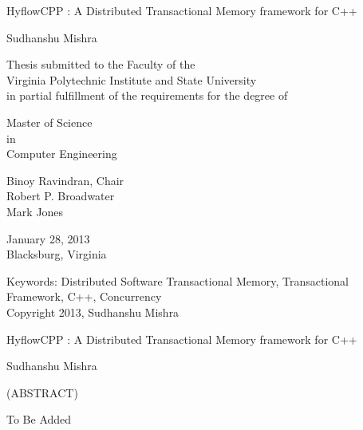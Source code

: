 \documentclass[12pt,english]{report}
\begin{document}
\thispagestyle{empty}
\begin{center}

{\Large 
HyflowCPP : A Distributed Transactional Memory framework for C++
}

\vfill

Sudhanshu Mishra

\vfill

Thesis submitted to the Faculty of the \\
Virginia Polytechnic Institute and State University \\
in partial fulfillment of the requirements for the degree of

\vfill

Master of Science \\
in \\
Computer Engineering


\vfill

Binoy Ravindran, Chair \\
Robert P. Broadwater \\
Mark Jones


\vfill

January 28, 2013 \\
Blacksburg, Virginia

\vfill

Keywords: Distributed Software Transactional Memory, Transactional Framework, C++, Concurrency
\\
Copyright 2013, Sudhanshu Mishra

\end{center}

\pagebreak

\thispagestyle{empty}
\begin{center}

{\large
HyflowCPP : A Distributed Transactional Memory framework for C++
}

\vfill

Sudhanshu Mishra

\vfill

(ABSTRACT)

\vfill

\end{center}

To Be Added




\vfill


\end{document}
